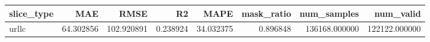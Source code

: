 \begin{tabular}{lrrrrrrr}
\toprule
slice_type & MAE & RMSE & R2 & MAPE & mask_ratio & num_samples & num_valid \\
\midrule
urllc & 64.302856 & 102.920891 & 0.238924 & 34.032375 & 0.896848 & 136168.000000 & 122122.000000 \\
\bottomrule
\end{tabular}
